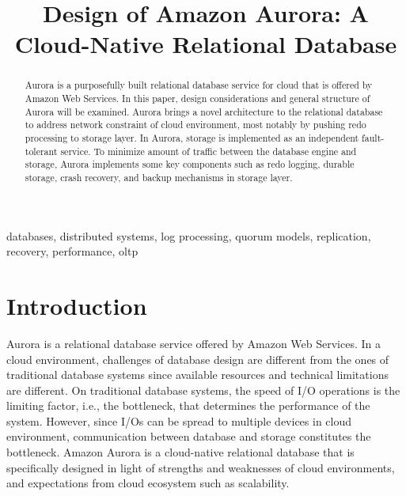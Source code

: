 \documentclass[conference]{IEEEtran}
\begin{document}
\title{Design of Amazon Aurora\cite{aurora}: A Cloud-Native Relational Database}

\author{
}

\maketitle

\begin{abstract}
Aurora is a purposefully built relational database service for cloud that is offered by Amazon Web Services. In this paper, design considerations and general structure of Aurora will be examined. Aurora brings a novel architecture to the relational database to address network constraint of cloud environment, most notably by pushing redo processing to storage layer. In Aurora, storage is implemented as an independent fault-tolerant service. To minimize amount of traffic between the database engine and storage, Aurora implements some key components such as redo logging, durable storage, crash recovery, and backup mechanisms in storage layer.\end{abstract}

\begin{IEEEkeywords}
databases, distributed systems, log processing, quorum models, replication, recovery, performance, oltp
\end{IEEEkeywords}

\section{Introduction}
Aurora is a relational database service offered by Amazon Web Services. In a cloud environment, challenges of database design are different from the ones of traditional database systems since available resources and technical limitations are different. On traditional database systems, the speed of I/O operations is the limiting factor, i.e., the bottleneck, that determines the performance of the system. However, since I/Os can be spread to multiple devices in cloud environment, communication between database and storage constitutes the bottleneck. Amazon Aurora is a cloud-native relational database that is specifically designed in light of strengths and weaknesses of cloud environments, and expectations from cloud ecosystem such as scalability. 
\end{document}
